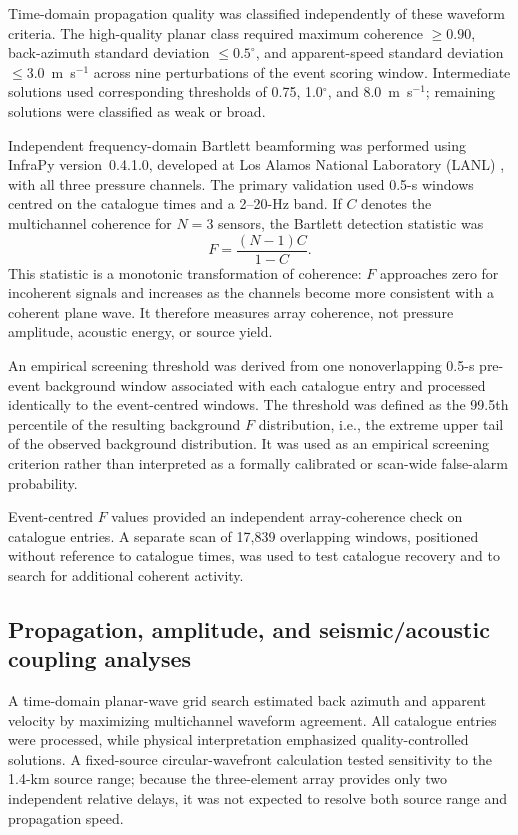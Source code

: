 \documentclass[]{seismica}
\begin{document}
Time-domain propagation quality was classified independently of these waveform
criteria. The high-quality planar class required maximum coherence
$\geq0.90$, back-azimuth standard deviation $\leq0.5^\circ$, and
apparent-speed standard deviation $\leq3.0$~m~s$^{-1}$ across nine
perturbations of the event scoring window. Intermediate solutions used
corresponding thresholds of 0.75, 1.0$^\circ$, and 8.0~m~s$^{-1}$; remaining
solutions were classified as weak or broad.

Independent frequency-domain Bartlett beamforming was performed using InfraPy
version~0.4.1.0, developed at Los Alamos National Laboratory (LANL)
\citep{webster_infrapy_2025}, with all three pressure channels.
The primary validation used 0.5-s windows centred on the catalogue
times and a 2--20-Hz band. If $C$ denotes the multichannel coherence for
$N=3$ sensors, the Bartlett detection statistic was
\begin{equation}
 F=\frac{(N-1)C}{1-C}.
\end{equation}
This statistic is a monotonic transformation of coherence: $F$ approaches
zero for incoherent signals and increases as the channels become more
consistent with a coherent plane wave. It therefore measures array coherence,
not pressure amplitude, acoustic energy, or source yield.

An empirical screening threshold was derived from one nonoverlapping
0.5-s pre-event background window associated with each catalogue entry and
processed identically to the event-centred windows. The threshold was defined
as the 99.5th percentile of the resulting background $F$ distribution, i.e.,
the extreme upper tail of the observed background distribution. It was used
as an empirical screening criterion rather than interpreted as a formally
calibrated or scan-wide false-alarm probability.

Event-centred $F$ values provided an independent array-coherence check on
catalogue entries. A separate scan of 17,839 overlapping windows, positioned
without reference to catalogue times, was used to test catalogue recovery and
to search for additional coherent activity.

\subsection{Propagation, amplitude, and seismic/acoustic coupling analyses}

A time-domain planar-wave grid search estimated back azimuth and apparent
velocity by maximizing multichannel waveform agreement. All catalogue entries
were processed, while physical interpretation emphasized quality-controlled
solutions. A fixed-source circular-wavefront calculation tested sensitivity to
the 1.4-km source range; because the three-element array provides only two
independent relative delays, it was not expected to resolve both source range
and propagation speed.
\end{document}
